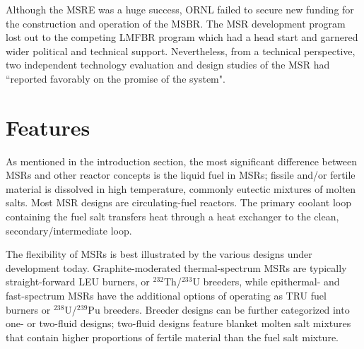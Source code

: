 Although the \gls{MSRE} was a huge success, \gls{ORNL} failed to secure new
funding for the construction and operation of the \gls{MSBR}. The \gls{MSR}
development program lost out to the competing \gls{LMFBR} program which had
a head start and garnered wider political and technical support.
Nevertheless, from a technical perspective, two independent technology
evaluation and design studies of the \gls{MSR} had ``reported favorably on
the promise of the system".

\section{Features}

As mentioned in the introduction section, the most significant difference
between \glspl{MSR} and other reactor
concepts is the liquid fuel in \glspl{MSR}; fissile and/or fertile material
is dissolved in
high temperature, commonly eutectic mixtures of molten salts. Most \gls{MSR}
designs are circulating-fuel reactors. The primary coolant loop containing
the fuel salt transfers heat through a heat exchanger to the clean,
secondary/intermediate loop.

The flexibility of \glspl{MSR} is best illustrated by the various designs
under development today. Graphite-moderated thermal-spectrum \glspl{MSR} are
typically straight-forward \gls{LEU} burners, or $^{232}$Th/$^{233}$U
breeders, while epithermal- and fast-spectrum \glspl{MSR} have the additional
options of operating as \gls{TRU} fuel burners or $^{238}$U/$^{239}$Pu
breeders. Breeder designs can be further categorized into one- or two-fluid
designs; two-fluid designs feature blanket molten salt mixtures that contain
higher proportions of fertile material than the fuel salt mixture.

